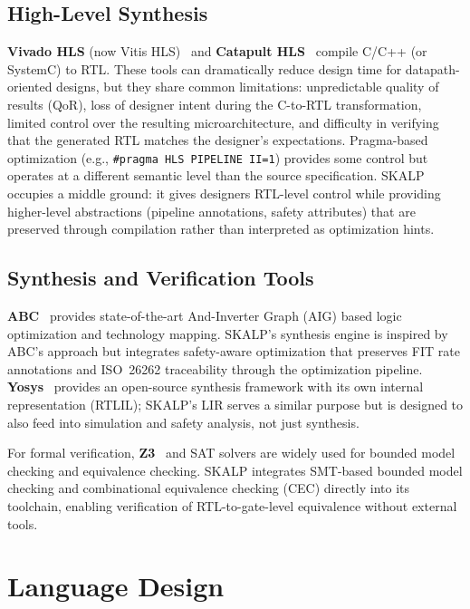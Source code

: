 \documentclass[conference]{IEEEtran}
\begin{document}
\subsection{High-Level Synthesis}

\textbf{Vivado HLS} (now Vitis HLS)~\cite{vivadohls} and \textbf{Catapult HLS}~\cite{catapulthls} compile C/C++ (or SystemC) to RTL. These tools can dramatically reduce design time for datapath-oriented designs, but they share common limitations: unpredictable quality of results (QoR), loss of designer intent during the C-to-RTL transformation, limited control over the resulting microarchitecture, and difficulty in verifying that the generated RTL matches the designer's expectations. Pragma-based optimization (e.g., \texttt{\#pragma HLS PIPELINE II=1}) provides some control but operates at a different semantic level than the source specification. SKALP occupies a middle ground: it gives designers RTL-level control while providing higher-level abstractions (pipeline annotations, safety attributes) that are preserved through compilation rather than interpreted as optimization hints.

\subsection{Synthesis and Verification Tools}

\textbf{ABC}~\cite{abc} provides state-of-the-art And-Inverter Graph (AIG) based logic optimization and technology mapping. SKALP's synthesis engine is inspired by ABC's approach but integrates safety-aware optimization that preserves FIT rate annotations and ISO~26262 traceability through the optimization pipeline. \textbf{Yosys}~\cite{yosys} provides an open-source synthesis framework with its own internal representation (RTLIL); SKALP's LIR serves a similar purpose but is designed to also feed into simulation and safety analysis, not just synthesis.

For formal verification, \textbf{Z3}~\cite{z3} and SAT solvers are widely used for bounded model checking and equivalence checking. SKALP integrates SMT-based bounded model checking and combinational equivalence checking (CEC) directly into its toolchain, enabling verification of RTL-to-gate-level equivalence without external tools.

\section{Language Design}
\label{sec:language}
\end{document}
